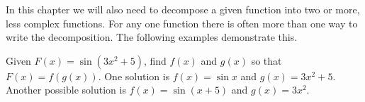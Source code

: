 In this chapter we will also need to decompose a given function into two or more, less complex functions. For any one function there is often more than one way to write the decomposition. The following examples demonstrate this.

\begin{example}\label{ex_prereq_decomp}
Given $F(x)=\sin(3x^2+5)$, find $f(x)$ and $g(x)$ so that $F(x) = f(g(x))$.
\solution
One solution is $f(x)=\sin x$ and $g(x)=3x^2+5$.\\
Another possible solution is $f(x)=\sin (x+5)$ and $g(x)=3x^2$.
\end{example}

